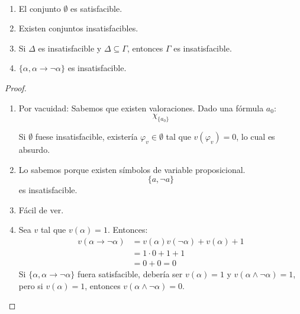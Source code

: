 \begin{prop}
    \ 
    \begin{enumerate}
        \item El conjunto $\emptyset $ es satisfacible.
        \item Existen conjuntos insatisfacibles.
        \item Si $\Delta$ es insatisfacible y $\Delta \subseteq \Gamma$, entonces $\Gamma$ es insatisfacible.
        \item $\{\alpha,\alpha\rightarrow\lnot\alpha\}$ es insatisfacible.
    \end{enumerate}
    \begin{proof}
        \ 
        \begin{enumerate}
            \item Por vacuidad:\newline
                Sabemos que existen valoraciones. Dado una fórmula $a_0$:
                \begin{equation*}
                    \chi_{\{a_0\}}
                \end{equation*}

                Si $\emptyset $ fuese insatisfacible, existería $\varphi_v\in \emptyset $ tal que $v(\varphi_v)=0$, lo cual es absurdo.
            \item Lo sabemos porque existen símbolos de variable proposicional.
                \begin{equation*}
                    \{a, \lnot a\}
                \end{equation*}
                es insatisfacible.
            \item Fácil de ver.
            \item Sea $v$ tal que $v(\alpha)=1$. Entonces:
                \begin{align*}
                    v(\alpha\rightarrow\lnot\alpha)&=v(\alpha)v(\lnot\alpha)+v(\alpha)+1\\
                    &= 1\cdot 0+1+1 \\
                    &= 0 + 0 = 0
                \end{align*}
                Si $\{\alpha,\alpha\rightarrow\lnot\alpha\}$ fuera satisfacible, debería ser $v(\alpha)=1$ y $v(\alpha\land\lnot\alpha)=1$, pero si $v(\alpha)=1$, entonces $v(\alpha\land\lnot\alpha)=0$.
        \end{enumerate}
    \end{proof}
\end{prop}

